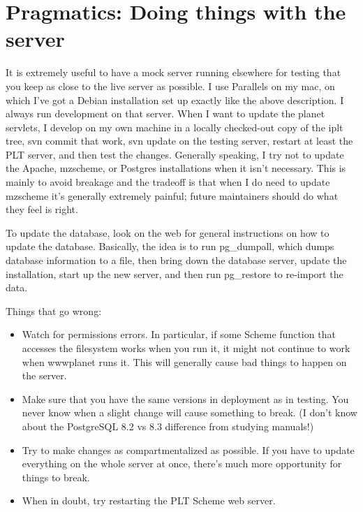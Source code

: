 \documentclass{article}
\begin{document}
\section{Pragmatics: Doing things with the server}

It is extremely useful to have a mock server running elsewhere for
testing that you keep as close to the live server as possible. I use
Parallels on my mac, on which I've got a Debian installation set up
exactly like the above description. I always run development on that
server. When I want to update the planet servlets, I develop on my own
machine in a locally checked-out copy of the iplt tree, svn commit
that work, svn update on the testing server, restart at least the PLT
server, and then test the changes. Generally speaking, I try not to
update the Apache, mzscheme, or Postgres installations when it isn't
necessary. This is mainly to avoid breakage and the tradeoff is that
when I do need to update mzscheme it's generally extremely painful;
future maintainers should do what they feel is right.

To update the database, look on the web for general instructions on
how to update the database. Basically, the idea is to run pg\_dumpall,
which dumps database information to a file, then bring down the
database server, update the installation, start up the new server, and
then run pg\_restore to re-import the data.

Things that go wrong:

\begin{itemize}
\item Watch for permissions errors. In particular, if some Scheme function
  that accesses the filesystem works when you run it, it might not
  continue to work when wwwplanet runs it. This will generally cause
  bad things to happen on the server.

\item Make sure that you have the same versions in deployment as in
  testing. You never know when a slight change will cause something to
  break. (I don't know about the PostgreSQL 8.2 vs 8.3 difference from
  studying manuals!)

\item Try to make changes as compartmentalized as possible. If you have to
  update everything on the whole server at once, there's much more
  opportunity for things to break.

\item When in doubt, try restarting the PLT Scheme web server.
\end{itemize}
\end{document}
